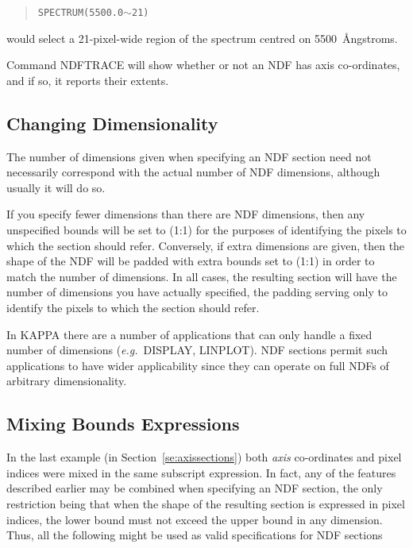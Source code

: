 {\small
\begin{quote}
\begin{center}
{\tt SPECTRUM(5500.0}$\sim${\tt 21)}
\end{center}
\end{quote}
\normalsize

would select a 21-pixel-wide region of the spectrum centred on
5500~{\AA}ngstroms.

Command NDFTRACE will show whether or not an NDF has axis co-ordinates, and 
if so, it reports their extents.

\subsection{Changing Dimensionality}

The number of dimensions given when specifying an NDF section need not
necessarily correspond with the actual number of NDF dimensions,
although usually it will do so. 

If you specify fewer dimensions than there are NDF dimensions, then
any unspecified bounds will be set to (1:1) for the purposes of
identifying the pixels to which the section should refer. Conversely, if
extra dimensions are given, then the shape of the NDF will be padded
with extra bounds set to (1:1) in order to match the number of
dimensions. In all cases, the resulting section will have the number of
dimensions you have actually specified, the padding serving only to
identify the pixels to which the section should refer. 

In {\small KAPPA} there are a number of applications that can only
handle a fixed number of dimensions ({\it e.g.}\ DISPLAY, LINPLOT).
NDF sections permit such applications to have wider applicability
since they can operate on full NDFs of arbitrary dimensionality.

\subsection{Mixing Bounds Expressions}

In the last example (in Section~\ref{se:axissections}) both {\em axis\/}
co-ordinates and pixel indices were mixed in the same subscript
expression. In fact, any of the features described earlier may be
combined when specifying an NDF section, the only restriction being that
when the shape of the resulting section is expressed in pixel indices,
the lower bound must not exceed the upper bound in any dimension. Thus,
all the following might be used as valid specifications for NDF
sections 

}
